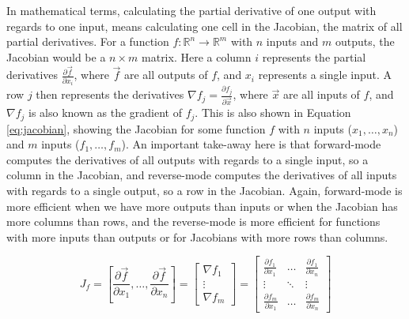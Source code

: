         In mathematical terms, calculating the partial derivative of one output with regards to one input, means calculating one cell in the Jacobian, the matrix of all partial derivatives.
        For a function $f:\mathbb{R}^n\to\mathbb{R}^m$ with $n$ inputs and $m$ outputs, the Jacobian would be a $n\times m$ matrix.
        Here a column $i$ represents the partial derivatives $\frac{\partial\vec{f}}{\partial x_i}$, where $\vec{f}$ are all outputs of $f$, and $x_i$ represents a single input.
        A row $j$ then represents the derivatives $\nabla f_j=\frac{\partial f_j}{\partial\vec{x}}$, where $\vec{x}$ are all inputs of $f$, and $\nabla f_j$ is also known as the gradient of $f_j$.
        This is also shown in Equation \ref{eq:jacobian}, showing the Jacobian for some function $f$ with $n$ inputs ($x_1,\dots,x_n$) and $m$ inputs ($f_1,\dots,f_m$).
        An important take-away here is that forward-mode computes the derivatives of all outputs with regards to a single input, so a column in the Jacobian, and reverse-mode computes the derivatives of all inputs with regards to a single output, so a row in the Jacobian.
        Again, forward-mode is more efficient when we have more outputs than inputs or when the Jacobian has more columns than rows, and the reverse-mode is more efficient for functions with more inputs than outputs or for Jacobians with more rows than columns.

        \begin{equation} \label{eq:jacobian}
            J_f=\left[\frac{\partial \vec{f}}{\partial x_1},\dots,\frac{\partial \vec{f}}{\partial x_n}\right]=\begin{bmatrix}\nabla f_1\\\vdots\\\nabla f_m\end{bmatrix}=\begin{bmatrix}
                \frac{\partial f_1}{\partial x_1} & \dots & \frac{\partial f_1}{\partial x_n}\\
                \vdots & \ddots & \vdots\\
                \frac{\partial f_m}{\partial x_1} & \dots & \frac{\partial f_m}{\partial x_n}
            \end{bmatrix}
        \end{equation}


